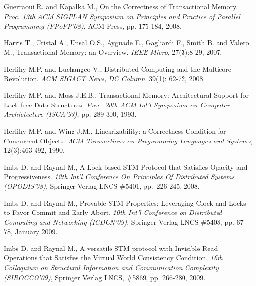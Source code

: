 \begin{thebibliography}{99}
{
Guerraoui R. and Kapa\l{}ka M., 
On the Correctness of Transactional Memory. 
{\it Proc. 13th ACM SIGPLAN Symposium on Principles and Practice of 
Parallel Programming (PPoPP'08)}, ACM Press, pp. 175-184, 2008. 


Harris T., Cristal  A., Unsal O.S., Ayguade E., Gagliardi  F., Smith B. and
Valero M., 
Transactional Memory: an Overview. 
{\it IEEE Micro}, 27(3):8-29, 2007. 


Herlihy M.P.  and Luchangco V.,
Distributed Computing and the Multicore Revolution.
{\it ACM SIGACT News, DC Column}, 39(1): 62-72, 2008.




Herlihy M.P.  and Moss J.E.B., 
Transactional Memory: Architectural Support for Lock-free Data Structures. 
{\it Proc. 20th ACM Int'l Symposium  on Computer Archictecture (ISCA'93)}, 
pp. 289-300, 1993. 


Herlihy M.P.  and Wing J.M.,
Linearizability: a Correctness Condition for Concurrent Objects. 
{\it ACM Transactions on Programming Languages and Systems}, 
12(3):463-492, 1990. 




Imbs D. and Raynal M.,
A Lock-based STM Protocol  that Satisfies Opacity and Progressiveness. 
{\it 12th Int'l Conference On Principles Of Distributed Systems
(OPODIS'08)},   Springer-Verlag LNCS  \#5401, pp.~226-245, 2008. 


Imbs D. and Raynal M.,
Provable STM Properties: Leveraging Clock and Locks to Favor Commit 
and Early Abort.
{\it 10th Int'l Conference on Distributed Computing and  Networking
(ICDCN'09)},  Springer-Verlag LNCS  \#5408, pp. 67-78, January 2009. 


%

Imbs D. and Raynal M., 
A versatile   STM protocol with Invisible Read Operations
that Satisfies  the  Virtual World Consistency Condition.
{\it  16th  Colloquium   on  Structural   Information   and  Communication
Complexity  (SIROCCO'09)}, Springer Verlag LNCS,  \#5869,  pp. 266-280, 2009. 

}
\end{thebibliography}

